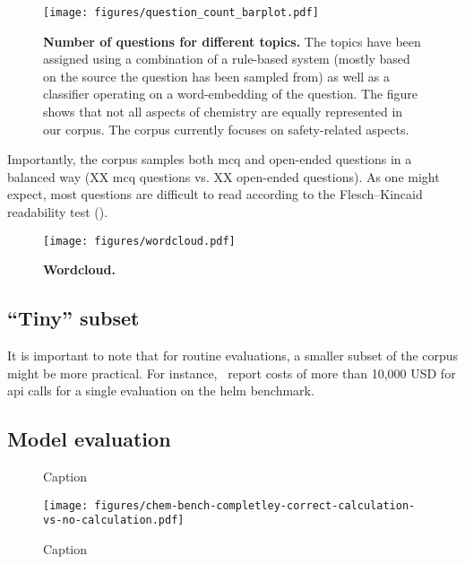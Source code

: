 \documentclass[11pt, oneside]{article}
\begin{document}
\begin{figure}
    \centering
    \texttt{[image: figures/question\_count\_barplot.pdf]}
    \caption{\textbf{Number of questions for different topics.} The topics have been assigned using a combination of a rule-based system (mostly based on the source the question has been sampled from) as well as a classifier operating on a word-embedding of the question. The figure shows that not all aspects of chemistry are equally represented in our corpus. The corpus currently focuses on safety-related aspects.}
    \label{fig:topic_barplot}
\end{figure}

Importantly, the corpus samples both \gls{mcq} and open-ended questions in a balanced way (XX \gls{mcq} questions vs. XX open-ended questions).
As one might expect, most questions are difficult to read according to the Flesch–Kincaid readability test ().~\cite{kincaid1975derivation}


\begin{figure}
    \centering
    \texttt{[image: figures/wordcloud.pdf]}
    \caption{\textbf{Wordcloud.}}
    \label{fig:wordcloud}
\end{figure}


\subsection{\enquote{Tiny} subset}
It is important to note that for routine evaluations, a smaller subset of the corpus might be more practical.\cite{polo2024tinybenchmarks}
For instance,~\citet{liang2023holistic} report costs of more than 10,000 USD for \gls{api} calls for a single evaluation on the \gls{helm} benchmark.


\subsection{Model evaluation}


\begin{figure}
    \centering
    \caption{Caption}
    \label{fig:enter-label}
\end{figure}


\begin{figure}
    \centering
    \texttt{[image: figures/chem-bench-completley-correct-calculation-vs-no-calculation.pdf]}
    \caption{Caption}
    \label{fig:enter-label}
\end{figure}
\end{document}
